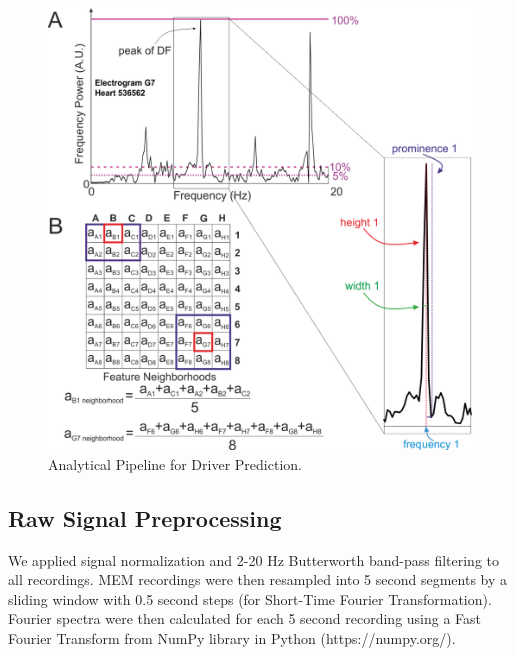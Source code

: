 \documentclass{article}
\begin{document}
\begin{figure}[ht]
\vskip 0.2in
\begin{center}
\centerline{\includegraphics[width=\columnwidth]{image3.png}}
\caption{Analytical Pipeline for Driver Prediction.}
\label{icml-historical}
\end{center}
\vskip -0.2in
\end{figure}

\subsection{Raw Signal Preprocessing}

We applied signal normalization and 2-20 Hz Butterworth band-pass filtering to all recordings. MEM recordings were then resampled into 5 second segments by a sliding window with 0.5 second steps (for Short-Time Fourier Transformation). Fourier spectra were then calculated for each 5 second recording using a Fast Fourier Transform from NumPy library in Python (https://numpy.org/).
\end{document}
